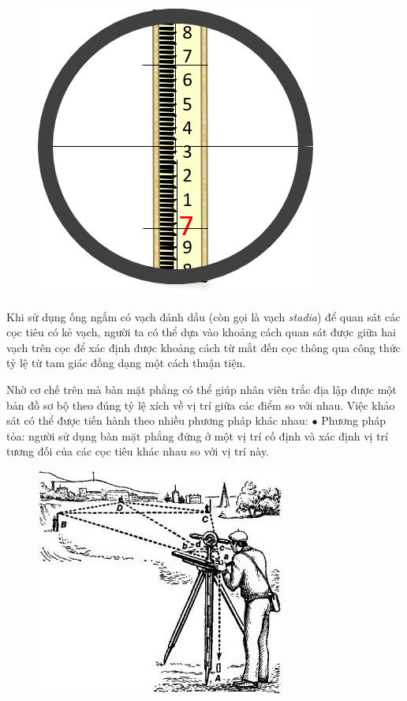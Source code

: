 \begin{multicols}{2}
{\begin{figure}[H]
		\includegraphics[height= 0.4\linewidth]{5}
		\vspace*{-10pt}
	\end{figure}
	Khi sử dụng ống ngắm có vạch đánh dấu (còn gọi là vạch \textit{stadia}) để quan sát các cọc tiêu có kẻ vạch, người ta có thể dựa vào khoảng cách quan sát được giữa hai vạch trên cọc để xác định được khoảng cách từ mắt đến cọc thông qua công thức tỷ lệ từ tam giác đồng dạng một cách thuận tiện.
	}
	\vskip 0.2cm
	Nhờ cơ chế trên mà bàn mặt phẳng có thể giúp nhân viên trắc địa lập được một bản đồ sơ bộ theo đúng tỷ lệ xích về vị trí giữa các điểm so với nhau. Việc khảo sát có thể được tiến hành theo nhiều  phương pháp khác nhau:
	\vskip 0.1cm
	$\bullet$ Phương pháp tỏa: người sử dụng bàn mặt phẳng đứng ở một vị trí cố định và xác định vị trí tương đối của các cọc tiêu khác nhau so với vị trí này.
	\begin{figure}[H]
		\vspace*{5pt}
		\centering
		\captionsetup{labelformat= empty, justification=centering}
		\includegraphics[width= 1\linewidth]{6}

\end{figure}
\end{multicols}
